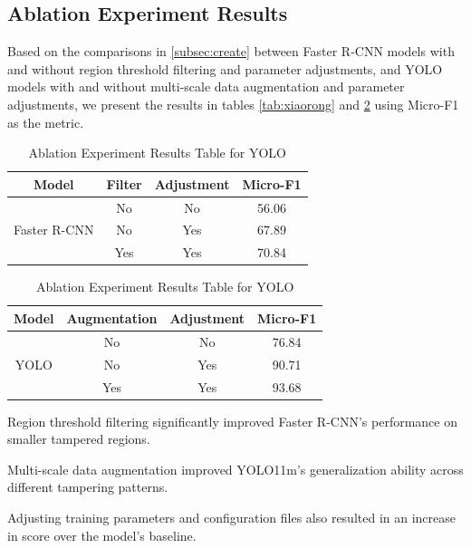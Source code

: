 \subsection{Ablation Experiment Results}

Based on the comparisons in \cref{subsec:create} between Faster R-CNN models with and without region threshold filtering and parameter adjustments, and YOLO models with and without multi-scale data augmentation and parameter adjustments, we present the results in tables \cref{tab:xiaorong} and \cref{tab:xiaorong2} using Micro-F1 as the metric.

\begin{table}
  \centering
  \begin{tabular}{c|c|c|c}
    \toprule
    Model                         & Filter & Adjustment & Micro-F1 \\
    \midrule
    \multirow{3}{*}{Faster R-CNN} & No     & No         & 56.06    \\
                                  & No     & Yes        & 67.89    \\
                                  & Yes    & Yes        & 70.84    \\
    \bottomrule
  \end{tabular}
  \caption{Ablation Experiment Results Table for Faster R-CNN}
  \label{tab:xiaorong}
  \vspace{\baselineskip}
  \begin{tabular}{c|c|c|c}
    \toprule
    Model                 & Augmentation & Adjustment & Micro-F1 \\
    \midrule
    \multirow{3}{*}{YOLO} & No           & No         & 76.84    \\
                          & No           & Yes        & 90.71    \\
                          & Yes          & Yes        & 93.68   \\
    \bottomrule
  \end{tabular}
  \caption{Ablation Experiment Results Table for YOLO}
  \label{tab:xiaorong2}
\end{table}

Region threshold filtering significantly improved Faster R-CNN's performance on smaller tampered regions.

Multi-scale data augmentation improved YOLO11m's generalization ability across different tampering patterns.

Adjusting training parameters and configuration files also resulted in an increase in score over the model's baseline.
